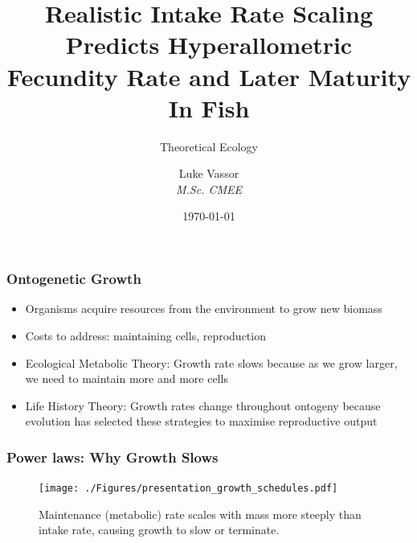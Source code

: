 \documentclass[handout]{beamer}
\institute{\texttt{[image: logo.png]}}
\title{Realistic Intake Rate Scaling Predicts Hyperallometric Fecundity Rate and Later Maturity In Fish}
\subtitle{Theoretical Ecology}
\author{Luke Vassor \\ \textit{M.Sc. CMEE}}
\date{\today}
\begin{document}
 
\frame{\titlepage}


\begin{frame}
	\frametitle{Ontogenetic Growth}
	\begin{itemize}
		\item Organisms acquire resources from the environment to grow new biomass
		\item Costs to address: maintaining cells, reproduction
		\item Ecological Metabolic Theory: Growth rate slows because as we grow larger, we need to maintain more and more cells
		\item Life History Theory: Growth rates change throughout ontogeny because evolution has selected these strategies to maximise reproductive output
	\end{itemize}

			
\end{frame}


\begin{frame}
	\frametitle{Power laws: Why Growth Slows}
		\centering
		\begin{figure}
			\texttt{[image: ./Figures/presentation\_growth\_schedules.pdf]} \
			\caption{Maintenance (metabolic) rate scales with mass more steeply than intake rate, causing growth to slow or terminate.}
		\end{figure}
\end{frame}
\end{document}
